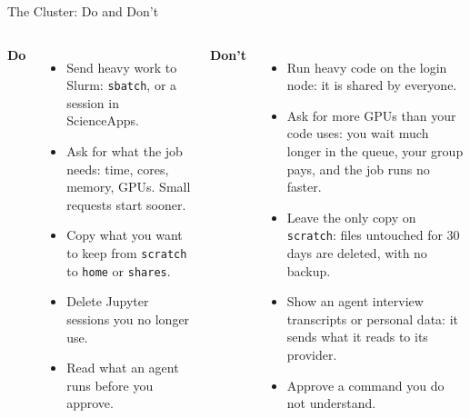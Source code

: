 \documentclass[svgnames,x11names,dvipsnames]{beamer}
\newcommand{\chg}[1]{{\bfseries #1}}
\renewcommand{\chg}[1]{#1}
\begin{document}
\begin{frame}{\chg{The Cluster: Do and Don't}}
\footnotesize
\begin{columns}[T]
\textbf{\textcolor{titleblue}{Do}}
\begin{itemize}
    \setlength{\itemsep}{4pt}
    \item Send heavy work to Slurm: \texttt{sbatch}, or a session in ScienceApps.
    \item Ask for what the job needs: time, cores, memory, GPUs. Small requests start sooner.
    \item Copy what you want to keep from \texttt{scratch} to \texttt{home} or \texttt{shares}.
    \item Delete Jupyter sessions you no longer use.
    \item Read what an agent runs before you approve.
\end{itemize}
\textbf{\textcolor{accentred}{Don't}}
\begin{itemize}
    \setlength{\itemsep}{4pt}
    \item Run heavy code on the login node: it is shared by everyone.
    \item Ask for more GPUs than your code uses: you wait much longer in the queue, your group pays, and the job runs no faster.
    \item Leave the only copy on \texttt{scratch}: files untouched for 30 days are deleted, with no backup.
    \item Show an agent interview transcripts or personal data: it sends what it reads to its provider.
    \item Approve a command you do not understand.
\end{itemize}
\end{columns}
\end{frame}
\end{document}
